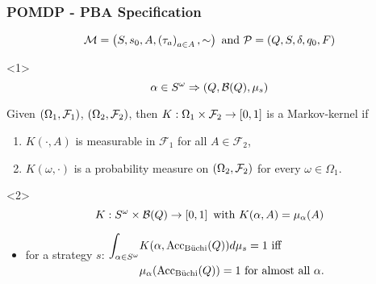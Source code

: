 \documentclass{beamer}
\begin{document}
\begin{frame}
    \frametitle{\ac{POMDP} - \ac{PBA} Specification}
    \begin{overlayarea}{\textwidth}{0.2\textheight}
      \begin{equation*}
        \mathcal{M} = \left(S, s_{0}, A, \left(\tau_{a}\right)_{a\in A}, \sim\right)
        \text{ and }
        \mathcal{P} = \left(Q, S, \delta, q_{0}, F\right)
      \end{equation*}
    \end{overlayarea}
    \begin{overlayarea}{\textwidth}{0.8\textheight}
      \begin{onlyenv}<1>
        \begin{equation*}
          \alpha\in S^{\omega}\Rightarrow\left(Q, \mathcal{B}(Q), \mu_{s}\right)
        \end{equation*}
        \begin{definition}
          Given $\left(\Omega_{1},\mathcal{F}_{1}\right)$,
          $\left(\Omega_{2},\mathcal{F}_{2}\right)$, then
          $K:\Omega_{1}\times\mathcal{F}_{2}\rightarrow \left[0,1\right]$ is a
          Markov-kernel if
          \begin{enumerate}
            \item $K(\cdot, A)$ is measurable in $\mathcal{F}_{1}$ for all
              $A\in\mathcal{F}_{2}$,
            \item $K(\omega, \cdot)$ is a probability measure on
              $\left(\Omega_{2},\mathcal{F}_{2}\right)$ for every
              $\omega\in\Omega_{1}$.
          \end{enumerate}
        \end{definition}
      \end{onlyenv}
      \begin{onlyenv}<2>
        \begin{equation*}
          K:S^{\omega}\times\mathcal{B}(Q)\rightarrow\left[0,1\right]
          \text{ with }
          K(\alpha, A) = \mu_{\alpha}(A)
        \end{equation*}
        \begin{itemize}
          \item for a strategy $s$:
            $\begin{aligned}
              \int_{\alpha\in S^{\omega}}&K(\alpha, \operatorname{Acc}_{\operatorname{B\ddot{u}chi}}(Q))d\mu_{s}
              = 1\text{ iff }\\
              &\mu_{\alpha}(\operatorname{Acc}_{\operatorname{B\ddot{u}chi}}(Q)) = 1\text{ for almost all }\alpha.
            \end{aligned}$

\end{itemize}
\end{onlyenv}
\end{overlayarea}
\end{frame}
\end{document}
